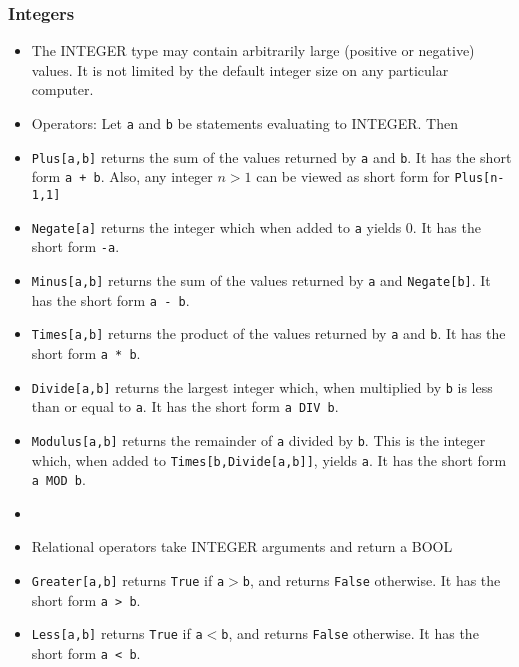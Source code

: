 \subsubsection{Integers}
\begin{itemize}
\item
The INTEGER type may contain arbitrarily large (positive or negative)
values.  It is not limited by the default integer size on any particular
computer.

\item
Operators:
Let \verb+a+ and \verb+b+ be statements evaluating to INTEGER. Then

\bd
\item
\verb+Plus[a,b]+ returns the sum of the values returned by
\verb+a+ and \verb+b+.  It has the short form \verb&a + b&.  Also,
any integer $n>1$ can be viewed as short form for \verb+Plus[n-1,1]+  
 
\item
\verb+Negate[a]+ returns the integer which when added to \verb+a+ yields
0.  It has the short form \verb&-a&.  
 
\item
\verb+Minus[a,b]+ returns the sum of the values returned by
\verb+a+ and \verb+Negate[b]+.  It has the short form \verb&a - b&.  

\item
\verb+Times[a,b]+ returns the product of the values returned by
\verb+a+ and \verb+b+.  It has the short form \verb+a * b+.

\item
\verb+Divide[a,b]+ returns the largest integer which, when
multiplied by \verb+b+ is less than or equal to \verb+a+.  It has the
short form \verb+a DIV b+.

\item
\verb+Modulus[a,b]+ returns the remainder of \verb+a+ divided by
\verb+b+.  This is the integer which, when added to
\verb+Times[b,Divide[a,b]]+, yields \verb+a+.  It has the short form 
\verb+a MOD b+.
\item

\ed
\item
Relational operators take INTEGER arguments and
return a BOOL
\bd
\item
\verb+Greater[a,b]+ returns \verb+True+ if \verb+a+$>$\verb+b+, and
returns \verb+False+ otherwise.  It has the short form \verb+a > b+.

\item
\verb+Less[a,b]+ returns \verb+True+ if \verb+a+$<$\verb+b+, and
returns \verb+False+ otherwise.  It has the short form \verb+a < b+.


\end{itemize}
